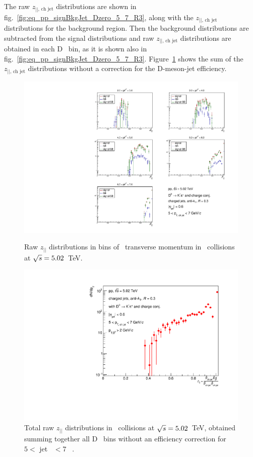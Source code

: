 The raw $z_{||\text{, ch jet}}$ distributions are shown in fig.~\ref{fig:eq_pp_signBkgJet_Dzero_5_7_R3}, along with the $z_{||\text{, ch jet}}$ distributions for the background region.
Then the background distributions are subtracted from the signal distributions and raw $z_{||\text{, ch jet}}$ distributions are obtained in each D \pt\ bin,
as it is shown also in fig.~\ref{fig:eq_pp_signBkgJet_Dzero_5_7_R3}.
Figure~\ref{fig:eq_pp_signBkgJet_tot_5_7_R3} shows the sum of the $z_{||\text{, ch jet}}$ distributions without a correction for the D-meson-jet efficiency.
\begin{figure}[bth]
\centering
\begin{minipage}{.65\textwidth}
  \centering
\includegraphics[width=\textwidth]{pp_2sig/R3_jetbin_5_7/jetRawSpectrum_pTD2}
\caption{Raw $z_{||}$ distributions in bins of \Dzero\ transverse momentum in \pp\ collisions at $\sqrt{s}=5.02$~TeV.}
\label{fig:eq_pp_signBkgJet_Dzero_5_7_R3}
\end{minipage}%
\begin{minipage}{.4\textwidth}
  \centering
\includegraphics[width=\textwidth]{pp_2sig/R3_jetbin_5_7/jetPtSpectrum_SB_pTD2}
\caption{Total raw $z_{||}$ distributions in \pp\ collisions at $\sqrt{s}=5.02$~TeV, obtained summing together all D \pt\ bins without an efficiency correction for $5<$ jet \pt\ $<7$ \GeVc\ .
}
\label{fig:eq_pp_signBkgJet_tot_5_7_R3}
\end{minipage}
\end{figure}
